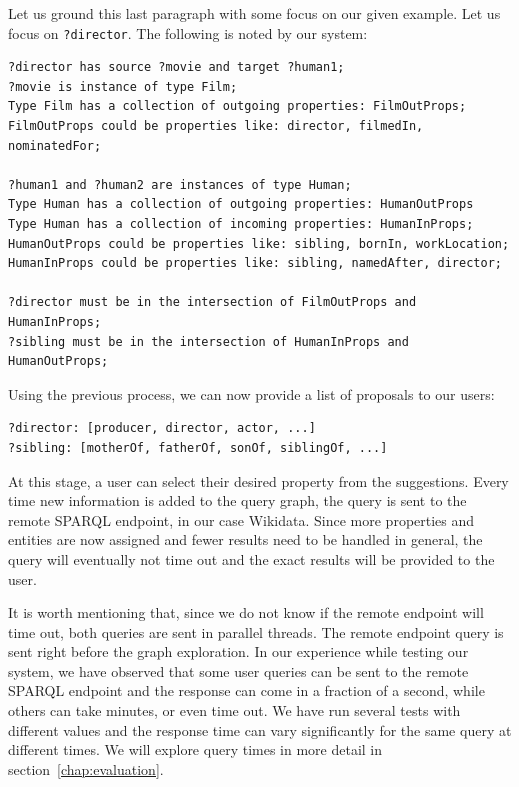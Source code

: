 \begin{example}
Let us ground this last paragraph with some focus on our given example. Let us focus on \texttt{?director}. The following is noted by our system:

\begin{verbatim}
?director has source ?movie and target ?human1;
?movie is instance of type Film;
Type Film has a collection of outgoing properties: FilmOutProps;
FilmOutProps could be properties like: director, filmedIn, nominatedFor;

?human1 and ?human2 are instances of type Human;
Type Human has a collection of outgoing properties: HumanOutProps
Type Human has a collection of incoming properties: HumanInProps;
HumanOutProps could be properties like: sibling, bornIn, workLocation;
HumanInProps could be properties like: sibling, namedAfter, director;

?director must be in the intersection of FilmOutProps and HumanInProps;
?sibling must be in the intersection of HumanInProps and HumanOutProps;
\end{verbatim}

Using the previous process, we can now provide a list of proposals to our users:
\begin{verbatim}
?director: [producer, director, actor, ...]
?sibling: [motherOf, fatherOf, sonOf, siblingOf, ...]
\end{verbatim}

At this stage, a user can select their desired property from the suggestions. 
Every time new information is added to the query graph, the query is sent to the remote SPARQL endpoint, in our case Wikidata. 
Since more properties and entities are now assigned and fewer results need to be handled in general, the query will eventually not time out and the exact results will be provided to the user.

\end{example}

It is worth mentioning that, since we do not know if the remote endpoint will time out, both queries are sent in parallel threads. The remote endpoint query is sent right before the graph exploration. 
In our experience while testing our system, we have observed that some user queries can be sent to the remote SPARQL endpoint and the response can come in a fraction of a second, while others can take minutes, or even time out. 
We have run several tests with different values and the response time can vary significantly for the same query at different times. We will explore query times in more detail in section~\autoref{chap:evaluation}.

